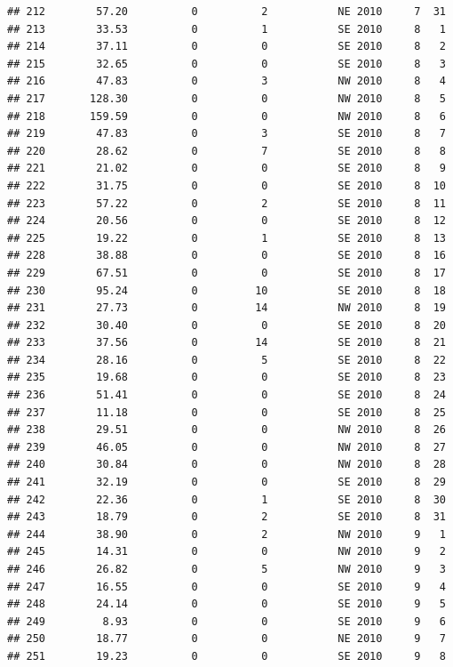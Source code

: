 \documentclass[
]{article}
\begin{document}
\begin{verbatim}
## 212        57.20          0          2           NE 2010     7  31
## 213        33.53          0          1           SE 2010     8   1
## 214        37.11          0          0           SE 2010     8   2
## 215        32.65          0          0           SE 2010     8   3
## 216        47.83          0          3           NW 2010     8   4
## 217       128.30          0          0           NW 2010     8   5
## 218       159.59          0          0           NW 2010     8   6
## 219        47.83          0          3           SE 2010     8   7
## 220        28.62          0          7           SE 2010     8   8
## 221        21.02          0          0           SE 2010     8   9
## 222        31.75          0          0           SE 2010     8  10
## 223        57.22          0          2           SE 2010     8  11
## 224        20.56          0          0           SE 2010     8  12
## 225        19.22          0          1           SE 2010     8  13
## 228        38.88          0          0           SE 2010     8  16
## 229        67.51          0          0           SE 2010     8  17
## 230        95.24          0         10           SE 2010     8  18
## 231        27.73          0         14           NW 2010     8  19
## 232        30.40          0          0           SE 2010     8  20
## 233        37.56          0         14           SE 2010     8  21
## 234        28.16          0          5           SE 2010     8  22
## 235        19.68          0          0           SE 2010     8  23
## 236        51.41          0          0           SE 2010     8  24
## 237        11.18          0          0           SE 2010     8  25
## 238        29.51          0          0           NW 2010     8  26
## 239        46.05          0          0           NW 2010     8  27
## 240        30.84          0          0           NW 2010     8  28
## 241        32.19          0          0           SE 2010     8  29
## 242        22.36          0          1           SE 2010     8  30
## 243        18.79          0          2           SE 2010     8  31
## 244        38.90          0          2           NW 2010     9   1
## 245        14.31          0          0           NW 2010     9   2
## 246        26.82          0          5           NW 2010     9   3
## 247        16.55          0          0           SE 2010     9   4
## 248        24.14          0          0           SE 2010     9   5
## 249         8.93          0          0           SE 2010     9   6
## 250        18.77          0          0           NE 2010     9   7
## 251        19.23          0          0           SE 2010     9   8

\end{verbatim}
\end{document}
